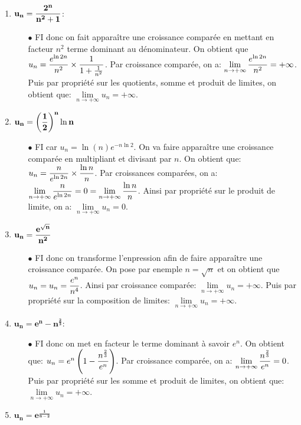 \documentclass[a4paper, 11pt]{article}
\begin{document}
\begin{correction}
\begin{enumerate}
\item $\mathbf{u_n=\displaystyle\frac{2^n}{n^2+1}}$:
\begin{itemize}
\item[$\bullet$]  FI donc on fait appara\^{i}tre une croissance compar\'ee en mettant en facteur $n^2$ terme dominant au d\'enominateur. On obtient que $u_n=\displaystyle\frac{e^{\ln{2}n}}{n^2}\times \displaystyle\frac{1}{1+\frac{1}{n^2}}$. Par croissance compar\'ee, on a: $\lim\limits_{n\to +\infty} \displaystyle\frac{e^{\ln{2}n}}{n^2}=+\infty$. Puis par propri\'et\'e sur les quotients, somme et produit de limites, on obtient que: $\lim\limits_{n\to +\infty} u_n=+\infty$.
\end{itemize} 
\item $\mathbf{u_n=\left( \displaystyle\frac{1}{2} \right)^n \ln{n}}$
\begin{itemize}
\item[$\bullet$]  FI car $u_n=\ln{(n)}e^{-n\ln{2}}$. On va faire appara\^{i}tre une croissance compar\'ee en multipliant et divisant par $n$. On obtient que: $u_n=\displaystyle\frac{n}{e^{\ln{2}n}}\times \displaystyle\frac{\ln{n}}{n}$. Par croissances compar\'ees, on a: $\lim\limits_{n\to +\infty} \displaystyle\frac{n}{e^{\ln{2}n}}=0=\lim\limits_{n\to +\infty} \displaystyle\frac{\ln{n}}{n}$. Ainsi par propri\'et\'e sur le produit de limite, on a: $\lim\limits_{n\to +\infty} u_n=0$. 
\end{itemize} 
\item  $\mathbf{u_n=\displaystyle\frac{e^{\sqrt{n}}}{n^2}}$
\begin{itemize}
\item[$\bullet$]  FI donc on transforme l'enpression afin de faire appara\^{i}tre une croissance compar\'ee. On pose par enemple $n=\sqrt{n}$ et on obtient que $u_n=u_n=\displaystyle\frac{e^n}{n^4}$. Ainsi par croissance compar\'ee: $\lim\limits_{n\to +\infty} u_n=+\infty$. Puis par propri\'et\'e sur la composition de limites: $\lim\limits_{n\to +\infty} u_n=+\infty$. 
\end{itemize} 
\item $\mathbf{u_n=e^n-n^{\frac{2}{3}}}$:
\begin{itemize}
\item[$\bullet$]  FI donc on met en facteur le terme dominant \`{a} savoir $e^n$. On obtient que: $u_n=e^n\left( 1-\displaystyle\frac{n^{\frac{2}{3}}}{e^n}  \right)$. Par croissance compar\'ee, on a: $\lim\limits_{n\to +\infty} \displaystyle\frac{n^{\frac{2}{3}}}{e^n} =0$. Puis par propri\'et\'e sur les somme et produit de limites, on obtient que: $\lim\limits_{n\to +\infty} u_n=+\infty$.
\end{itemize} 
\item $\mathbf{u_n=e^{\frac{1}{n-2}}}$

\end{enumerate}
\end{correction}
\end{document}
